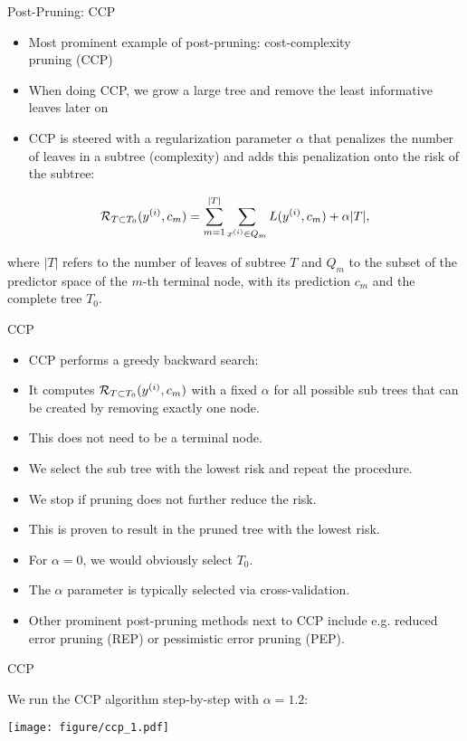 \documentclass[11pt,compress,t,notes=noshow, xcolor=table]{beamer}
\begin{document}
\begin{vbframe}{Post-Pruning: CCP}
\begin{itemize}
\item Most prominent example of post-pruning: cost-complexity \\ pruning (CCP)
\item When doing CCP, we grow a large tree and remove the least informative leaves later on
\item CCP is steered with a regularization parameter $\alpha$ that penalizes the number of leaves in a subtree (complexity) and adds this penalization onto the risk of the subtree:
\end{itemize}

$$\mathcal{R}_{T \subset T_0}(y^{(i)}, c_m) = \sum_{m=1}^{|T|} \sum_{x^{(i)} \in Q_m} L(y^{(i)}, c_m) + \alpha |T|,$$

where $|T|$ refers to the number of leaves of subtree $T$ and $Q_m$ to the subset of the predictor space of the $m$-th terminal node, with its prediction $c_m$ and the complete tree $T_0$.

\end{vbframe}

\begin{vbframe}{CCP}
\begin{itemize}
\item CCP performs a greedy backward search:
\item It computes $\mathcal{R}_{T \subset T_0}(y^{(i)}, c_m)$ with a fixed $\alpha$ for all possible sub trees that can be created by removing exactly one node.
\item This does not need to be a terminal node.
\item We select the sub tree with the lowest risk and repeat the procedure.
\item We stop if pruning does not further reduce the risk.
\item This is proven to result in the pruned tree with the lowest risk.
\item For $\alpha = 0$, we would obviously select $T_0$.
\item The $\alpha$ parameter is typically selected via cross-validation.
\item Other prominent post-pruning methods next to CCP include e.g. reduced error pruning (REP) or pessimistic error pruning (PEP).
\end{itemize}
\end{vbframe}


\begin{frame}{CCP}

We run the CCP algorithm step-by-step with $\alpha = 1.2$:
\vspace{0.25cm}

\color{fgcolor}

{\centering \texttt{[image: figure/ccp\_1.pdf]} 

}

\end{frame}
\end{document}
